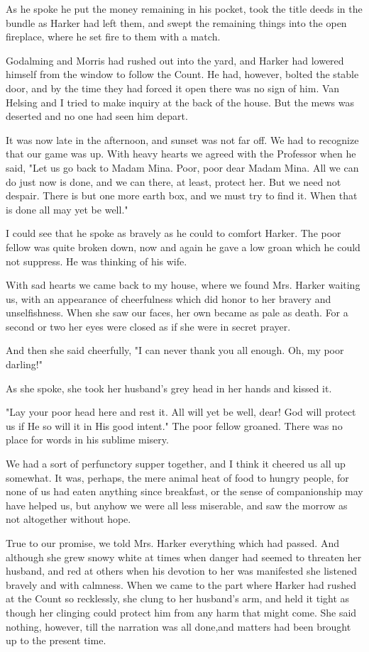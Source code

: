 As he spoke he put the money remaining in his pocket, took the title deeds in the bundle as Harker had left them, and swept the remaining things into the open fireplace, where he set fire to them with a match. 

Godalming and Morris had rushed out into the yard, and Harker had lowered himself from the window to follow the Count. He had, however, bolted the stable door, and by the time they had forced it open there was no sign of him. Van Helsing and I tried to make inquiry at the back of the house. But the mews was deserted and no one had seen him depart. 

It was now late in the afternoon, and sunset was not far off. We had to recognize that our game was up. With heavy hearts we agreed with the Professor when he said, "Let us go back to Madam Mina. Poor, poor dear Madam Mina. All we can do just now is done, and we can there, at least, protect her. But we need not despair. There is but one more earth box, and we must try to find it. When that is done all may yet be well." 

I could see that he spoke as bravely as he could to comfort Harker. The poor fellow was quite broken down, now and again he gave a low groan which he could not suppress. He was thinking of his wife. 

With sad hearts we came back to my house, where we found Mrs. Harker waiting us, with an appearance of cheerfulness which did honor to her bravery and unselfishness. When she saw our faces, her own became as pale as death. For a second or two her eyes were closed as if she were in secret prayer. 

And then she said cheerfully, "I can never thank you all enough. Oh, my poor darling!" 

As she spoke, she took her husband's grey head in her hands and kissed it. 

"Lay your poor head here and rest it. All will yet be well, dear! God will protect us if He so will it in His good intent." The poor fellow groaned. There was no place for words in his sublime misery. 

We had a sort of perfunctory supper together, and I think it cheered us all up somewhat. It was, perhaps, the mere animal heat of food to hungry people, for none of us had eaten anything since breakfast, or the sense of companionship may have helped us, but anyhow we were all less miserable, and saw the morrow as not altogether without hope. 

True to our promise, we told Mrs. Harker everything which had passed. And although she grew snowy white at times when danger had seemed to threaten her husband, and red at others when his devotion to her was manifested she listened bravely and with calmness. When we came to the part where Harker had rushed at the Count so recklessly, she clung to her husband's arm, and held it tight as though her clinging could protect him from any harm that might come. She said nothing, however, till the narration was all done,and matters had been brought up to the present time. 


